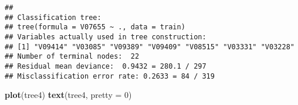 \documentclass[]{article}
\newenvironment{Shaded}{\begin{snugshade}}{\end{snugshade}}
\newcommand{\KeywordTok}[1]{\textcolor[rgb]{0.13,0.29,0.53}{\textbf{#1}}}
\newcommand{\DataTypeTok}[1]{\textcolor[rgb]{0.13,0.29,0.53}{#1}}
\newcommand{\DecValTok}[1]{\textcolor[rgb]{0.00,0.00,0.81}{#1}}
\newcommand{\StringTok}[1]{\textcolor[rgb]{0.31,0.60,0.02}{#1}}
\newcommand{\OperatorTok}[1]{\textcolor[rgb]{0.81,0.36,0.00}{\textbf{#1}}}
\newcommand{\NormalTok}[1]{#1}
\begin{document}
\begin{Shaded}
\end{Shaded}

\begin{verbatim}
## 
## Classification tree:
## tree(formula = V07655 ~ ., data = train)
## Variables actually used in tree construction:
## [1] "V09414" "V03085" "V09389" "V09409" "V08515" "V03331" "V03228"
## Number of terminal nodes:  22 
## Residual mean deviance:  0.9432 = 280.1 / 297 
## Misclassification error rate: 0.2633 = 84 / 319
\end{verbatim}

\begin{Shaded}
\begin{Highlighting}[]
\KeywordTok{plot}\NormalTok{(tree4)}
\KeywordTok{text}\NormalTok{(tree4, }\DataTypeTok{pretty =} \DecValTok{0}\NormalTok{)}
\end{Highlighting}
\end{Shaded}
\end{document}

